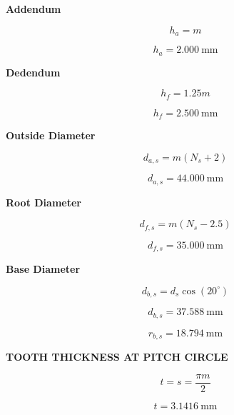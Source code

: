 \documentclass{article}
\begin{document}
\textbf{Addendum}

\begin{equation}
h_a = m
\end{equation}

\begin{equation}
h_a = 2.000\ \mathrm{mm}
\end{equation}

\textbf{Dedendum}

\begin{equation}
h_f = 1.25m
\end{equation}

\begin{equation}
h_f = 2.500\ \mathrm{mm}
\end{equation}

\textbf{Outside Diameter}

\begin{equation}
d_{a,s} = m(N_s+2)
\end{equation}

\begin{equation}
d_{a,s} = 44.000\ \mathrm{mm}
\end{equation}

\textbf{Root Diameter}

\begin{equation}
d_{f,s} = m(N_s-2.5)
\end{equation}

\begin{equation}
d_{f,s} = 35.000\ \mathrm{mm}
\end{equation}

\textbf{Base Diameter}

\begin{equation}
d_{b,s} = d_s\cos(20^\circ)
\end{equation}

\begin{equation}
d_{b,s} = 37.588\ \mathrm{mm}
\end{equation}

\begin{equation}
r_{b,s} = 18.794\ \mathrm{mm}
\end{equation}

\textbf{TOOTH THICKNESS AT PITCH CIRCLE}

\begin{equation}
t = s = \frac{\pi m}{2}
\end{equation}

\begin{equation}
t = 3.1416\ \mathrm{mm}
\end{equation}
\end{document}
